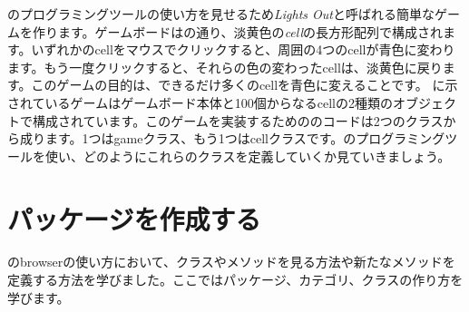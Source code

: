 \documentclass[a4paper,10pt,twoside]{book}
\begin{document}
\pharo のプログラミングツールの使い方を見せるため\emph{Lights Out}と呼ばれる簡単なゲームを作ります。ゲームボードはの通り、淡黄色の\emph{cell}の長方形配列で構成されます。いずれかのcellをマウスでクリックすると、周囲の4つのcellが青色に変わります。もう一度クリックすると、それらの色の変わったcellは、淡黄色に戻ります。このゲームの目的は、できるだけ多くのcellを青色に変えることです。
に示されているゲームはゲームボード本体と100個からなるcellの2種類のオブジェクトで構成されています。このゲームを実装するための\pharo のコードは2つのクラスから成ります。1つはgameクラス、もう1つはcellクラスです。\pharo のプログラミングツールを使い、どのようにこれらのクラスを定義していくか見ていきましょう。

\section{パッケージを作成する}

のbrowserの使い方において、クラスやメソッドを見る方法や新たなメソッドを定義する方法を学びました。ここではパッケージ、カテゴリ、クラスの作り方を学びます。

\end{document}

